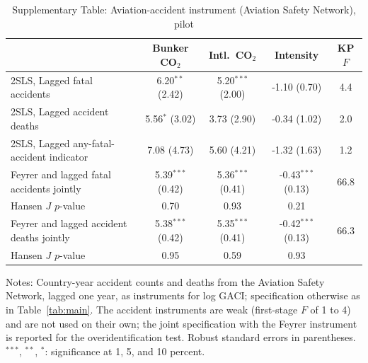 \begin{table}[htbp]
\centering
\begin{threeparttable}
\caption{Supplementary Table: Aviation-accident instrument (Aviation Safety Network), pilot}
\label{tab:accident_iv}
\footnotesize
\begin{tabular}{lcccc}
\toprule
 & Bunker CO$_2$ & Intl.\ CO$_2$ & Intensity & KP $F$ \\
\midrule
  2SLS, Lagged fatal accidents & 6.20$^{**}$ (2.42) & 5.20$^{***}$ (2.00) & -1.10 (0.70) & 4.4 \\
  2SLS, Lagged accident deaths & 5.56$^{*}$ (3.02) & 3.73 (2.90) & -0.34 (1.02) & 2.0 \\
  2SLS, Lagged any-fatal-accident indicator & 7.08 (4.73) & 5.60 (4.21) & -1.32 (1.63) & 1.2 \\
  Feyrer and lagged fatal accidents jointly & 5.39$^{***}$ (0.42) & 5.36$^{***}$ (0.41) & -0.43$^{***}$ (0.13) & 66.8 \\
  \quad Hansen $J$ $p$-value & 0.70 & 0.93 & 0.21 & \\
  Feyrer and lagged accident deaths jointly & 5.38$^{***}$ (0.42) & 5.35$^{***}$ (0.41) & -0.42$^{***}$ (0.13) & 66.3 \\
  \quad Hansen $J$ $p$-value & 0.95 & 0.59 & 0.93 & \\
\bottomrule
\end{tabular}
\begin{tablenotes}[flushleft]
\footnotesize
\item Notes: Country-year accident counts and deaths from the Aviation Safety Network, lagged one year, as instruments for log GACI; specification otherwise as in Table~\ref{tab:main}. The accident instruments are weak (first-stage $F$ of 1 to 4) and are not used on their own; the joint specification with the Feyrer instrument is reported for the overidentification test. Robust standard errors in parentheses. $^{***}$, $^{**}$, $^{*}$: significance at 1, 5, and 10 percent.
\end{tablenotes}
\end{threeparttable}
\end{table}
